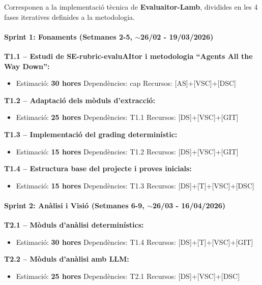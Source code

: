 \documentclass[12pt,a4paper,twoside]{report}
\begin{document}
Corresponen a la implementaci\'o t\`ecnica de \textbf{Evaluaitor-Lamb}, dividides en les 4 fases iteratives definides a la metodologia.

\paragraph{Sprint 1: Fonaments (Setmanes 2-5, $\sim$26/02 - 19/03/2026)}

\textbf{T1.1 -- Estudi de SE-rubric-evaluAItor i metodologia ``Agents All the Way Down'':}
\begin{itemize}
    \item Estimaci\'o: \textbf{30 hores} \quad Depend\`encies: cap \quad Recursos: [AS]+[VSC]+[DSC]
\end{itemize}

\textbf{T1.2 -- Adaptaci\'o dels m\`oduls d'extracci\'o:}
\begin{itemize}
    \item Estimaci\'o: \textbf{25 hores} \quad Depend\`encies: T1.1 \quad Recursos: [DS]+[VSC]+[GIT]
\end{itemize}

\textbf{T1.3 -- Implementaci\'o del grading determin\'istic:}
\begin{itemize}
    \item Estimaci\'o: \textbf{15 hores} \quad Depend\`encies: T1.2 \quad Recursos: [DS]+[VSC]+[GIT]
\end{itemize}

\textbf{T1.4 -- Estructura base del projecte i proves inicials:}
\begin{itemize}
    \item Estimaci\'o: \textbf{15 hores} \quad Depend\`encies: T1.3 \quad Recursos: [DS]+[T]+[VSC]+[DSC]
\end{itemize}

\paragraph{Sprint 2: An\`alisi i Visi\'o (Setmanes 6-9, $\sim$26/03 - 16/04/2026)}

\textbf{T2.1 -- M\`oduls d'an\`alisi determin\'istics:}
\begin{itemize}
    \item Estimaci\'o: \textbf{30 hores} \quad Depend\`encies: T1.4 \quad Recursos: [DS]+[T]+[VSC]+[GIT]
\end{itemize}

\textbf{T2.2 -- M\`oduls d'an\`alisi amb LLM:}
\begin{itemize}
    \item Estimaci\'o: \textbf{25 hores} \quad Depend\`encies: T2.1 \quad Recursos: [DS]+[VSC]+[DSC]
\end{itemize}
\end{document}
